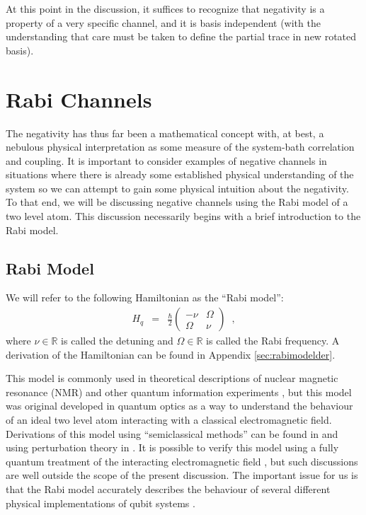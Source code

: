 At this point in the discussion, it suffices to recognize that negativity is a property of a very specific channel, and it is basis independent (with the understanding that care must be taken to define the partial trace in new rotated basis).

\section{Rabi Channels}
\label{sec:rabi}

The negativity has thus far been a mathematical concept with, at best, a nebulous physical interpretation as some measure of the system-bath correlation and coupling.  It is important to consider examples of negative channels in situations where there is already some established physical understanding of the system so we can attempt to gain some physical intuition about the negativity.  To that end, we will be discussing negative channels using the Rabi model of a two level atom.  This discussion necessarily begins with a brief introduction to the Rabi model.

\subsection{Rabi Model}

We will refer to the following Hamiltonian as the ``Rabi model'':
\begin{eqnarray*}
H_q &=& \frac{\hbar}{2}\begin{pmatrix}
-\nu & \Omega\\
\Omega & \nu
\end{pmatrix}\;\;,
\end{eqnarray*}
where $\nu\in\mathbb{R}$ is called the detuning and $\Omega\in\mathbb{R}$ is called the Rabi frequency.  A derivation of the Hamiltonian can be found in Appendix \ref{sec:rabimodelder}.

This model is commonly used in theoretical descriptions of nuclear magnetic resonance (NMR) and other quantum information experiments \cite{Mikio2008}, but this model was original developed in quantum optics as a way to understand the behaviour of an ideal two level atom interacting with a classical electromagnetic field.  Derivations of this model using ``semiclassical methods'' can be found in \cite{Kok2010,Barnett2002,Mandel1995,Loudon2000} and using perturbation theory in \cite{Loudon2000,Orszag2008,Suter1997}.  It is possible to verify this model using a fully quantum treatment of the interacting electromagnetic field \cite{Barnett2002}, but such discussions are well outside the scope of the present discussion.  The important issue for us is that the Rabi model accurately describes the behaviour of several different physical implementations of qubit systems \cite{Mikio2008}.

